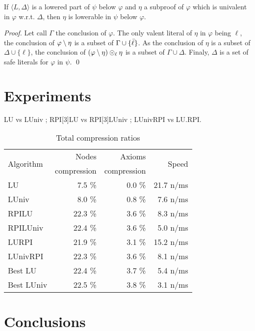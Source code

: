 \documentclass{llncs}
\begin{document}
\begin{proposition}
If $\langle L,\Delta \rangle$ is a lowered part of $\psi$ below $\varphi$ and $\eta$ a subproof of
$\varphi$ which is univalent in $\varphi$ w.r.t. $\Delta$, then $\eta$ is lowerable in $\psi$ below $\varphi$.
\end{proposition}

\begin{proof}
Let call $\Gamma$ the conclusion of $\varphi$.  The only valent literal of $\eta$ in $\varphi$ being
$\ell$, the conclusion of $\varphi \setminus \eta$ is a subset of $\Gamma \cup \{\bar{\ell}\}$. As the
conclusion of $\eta$ is a subset of $\Delta \cup \{\ell\}$, the conclusion of $\left(
\varphi \setminus \eta \right) \odot_\ell \eta$ is a subset of $\Gamma \cup \Delta$. Finaly, $\Delta$ is
a set of safe literals for $\varphi$ in $\psi$. \qed
\end{proof}


\section{Experiments}

\begin{jb}
LU vs LUniv ; RPI[3]LU vs RPI[3]LUniv ; LUnivRPI vs LU.RPI.
\end{jb}

\begin{table}[ht]
  \centering
  \begin{tabular}{lrrr}
    \toprule
    \multirow{2}{*}{Algorithm} & Nodes       & Axioms      & \multirow{2}{*}{Speed} \\
                               & compression & compression & \\
    \midrule
    LU         &  7.5 \% &  0.0 \% & 21.7 n/ms \\
    LUniv      &  8.0 \% &  0.8 \% &  7.6 n/ms \\
    RPILU      & 22.3 \% &  3.6 \% &  8.3 n/ms \\
    RPILUniv   & 22.4 \% &  3.6 \% &  5.0 n/ms \\
    LURPI      & 21.9 \% &  3.1 \% & 15.2 n/ms \\
    LUnivRPI   & 22.3 \% &  3.6 \% &  8.1 n/ms \\
    Best LU    & 22.4 \% &  3.7 \% &  5.4 n/ms \\
    Best LUniv & 22.5 \% &  3.8 \% &  3.1 n/ms \\
    \bottomrule
  \end{tabular}
  \caption{Total compression ratios}
\end{table}






\section{Conclusions}



\end{document}
